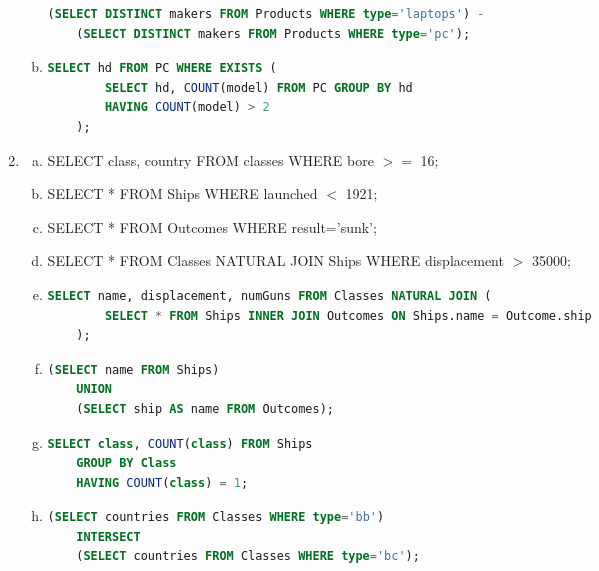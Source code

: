 \documentclass[12pt]{article}
\begin{document}
\begin{enumerate}[1.]
\begin{enumerate}[a)]
    \begin{lstlisting}[language=SQL]
    (SELECT DISTINCT makers FROM Products WHERE type='laptops') -
    (SELECT DISTINCT makers FROM Products WHERE type='pc');
    \end{lstlisting}

        \item

    \begin{lstlisting}[language=SQL]
    SELECT hd FROM PC WHERE EXISTS (
        SELECT hd, COUNT(model) FROM PC GROUP BY hd
        HAVING COUNT(model) > 2
    );
    \end{lstlisting}
    \end{enumerate}

    \item

    \begin{enumerate}[a)]
        \item SELECT class, country FROM classes WHERE bore $>=$ 16;
        \item SELECT * FROM Ships WHERE launched $<$ 1921;
        \item SELECT * FROM Outcomes WHERE result='sunk';
        \item SELECT * FROM Classes NATURAL JOIN Ships WHERE displacement $>$ 35000;
        \item
    \begin{lstlisting}[language=SQL]
    SELECT name, displacement, numGuns FROM Classes NATURAL JOIN (
        SELECT * FROM Ships INNER JOIN Outcomes ON Ships.name = Outcome.ship
    );
    \end{lstlisting}

    \item

    \begin{lstlisting}[language=SQL]
    (SELECT name FROM Ships)
    UNION
    (SELECT ship AS name FROM Outcomes);
    \end{lstlisting}

    \item

    \begin{lstlisting}[language=SQL]
    SELECT class, COUNT(class) FROM Ships
    GROUP BY Class
    HAVING COUNT(class) = 1;
    \end{lstlisting}

    \item

    \begin{lstlisting}[language=SQL]
    (SELECT countries FROM Classes WHERE type='bb')
    INTERSECT
    (SELECT countries FROM Classes WHERE type='bc');
    \end{lstlisting}


\end{enumerate}
\end{enumerate}
\end{document}
